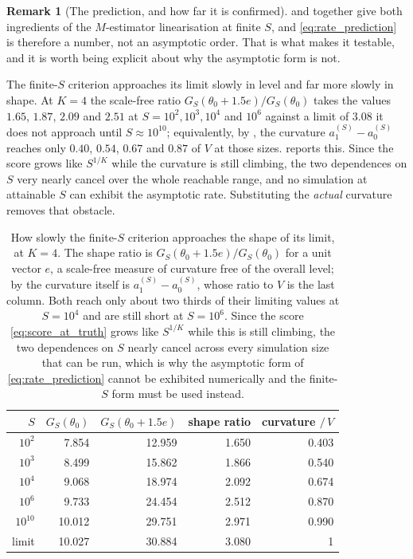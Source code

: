 \documentclass[11pt]{article}
\theoremstyle{definition}
\newtheorem{remark}[remark]{Remark}
\newcommand{\thetao}{\theta_0}
\begin{document}
\begin{remark}[The prediction, and how far it is confirmed]\label{rem:rate_numerics}
 and  together give both ingredients of the $M$-estimator linearisation at finite $S$, and \eqref{eq:rate_prediction} is therefore a number, not an asymptotic order. That is what makes it testable, and it is worth being explicit about why the asymptotic form is not.

The finite-$S$ criterion approaches its limit slowly in level and far more slowly in shape. At $K=4$ the scale-free ratio $G_S(\thetao+1.5e)/G_S(\thetao)$ takes the values $1.65$, $1.87$, $2.09$ and $2.51$ at $S=10^2,10^3,10^4$ and $10^6$ against a limit of $3.08$ it does not approach until $S\approx10^{10}$; equivalently, by , the curvature $a_1^{(S)}-a_0^{(S)}$ reaches only $0.40$, $0.54$, $0.67$ and $0.87$ of $V$ at those sizes.  reports this. Since the score grows like $S^{1/K}$ while the curvature is still climbing, the two dependences on $S$ very nearly cancel over the whole reachable range, and no simulation at attainable $S$ can exhibit the asymptotic rate. Substituting the \emph{actual} curvature removes that obstacle.

\begin{table}[htbp]
\centering
\caption{How slowly the finite-$S$ criterion approaches the shape of its limit, at $K=4$. The shape ratio is $G_S(\thetao+1.5e)/G_S(\thetao)$ for a unit vector $e$, a scale-free measure of curvature free of the overall level; by  the curvature itself is $a_1^{(S)}-a_0^{(S)}$, whose ratio to $V$ is the last column. Both reach only about two thirds of their limiting values at $S=10^4$ and are still short at $S=10^6$. Since the score \eqref{eq:score_at_truth} grows like $S^{1/K}$ while this is still climbing, the two dependences on $S$ nearly cancel across every simulation size that can be run, which is why the asymptotic form of \eqref{eq:rate_prediction} cannot be exhibited numerically and the finite-$S$ form must be used instead.}
\label{tab:criterion_shape}
\begin{tabular}{rrrrr}
\toprule
$S$ & $G_S(\thetao)$ & $G_S(\thetao+1.5e)$ & shape ratio & curvature $/\,V$ \\
\midrule
$10^2$ & 7.854 & 12.959 & 1.650 & 0.403 \\
$10^3$ & 8.499 & 15.862 & 1.866 & 0.540 \\
$10^4$ & 9.068 & 18.974 & 2.092 & 0.674 \\
$10^6$ & 9.733 & 24.454 & 2.512 & 0.870 \\
$10^{10}$ & 10.012 & 29.751 & 2.971 & 0.990 \\
\midrule
limit & 10.027 & 30.884 & 3.080 & 1 \\
\bottomrule
\end{tabular}
\end{table}


\end{remark}
\end{document}
